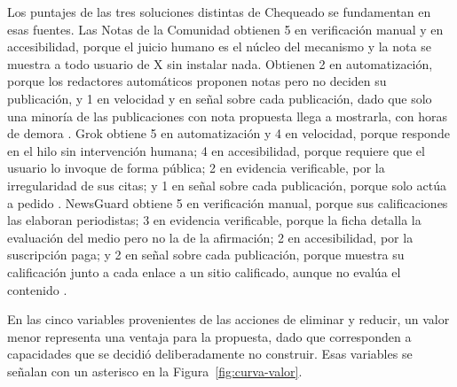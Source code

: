 Los puntajes de las tres soluciones distintas de Chequeado se fundamentan en esas fuentes. Las Notas de la Comunidad obtienen 5 en verificación manual y en accesibilidad, porque el juicio humano es el núcleo del mecanismo y la nota se muestra a todo usuario de X sin instalar nada. Obtienen 2 en automatización, porque los redactores automáticos proponen notas pero no deciden su publicación, y 1 en velocidad y en señal sobre cada publicación, dado que solo una minoría de las publicaciones con nota propuesta llega a mostrarla, con horas de demora \parencite{XCommunityNotes2026,SlaughterEtAl2025}. Grok obtiene 5 en automatización y 4 en velocidad, porque responde en el hilo sin intervención humana; 4 en accesibilidad, porque requiere que el usuario lo invoque de forma pública; 2 en evidencia verificable, por la irregularidad de sus citas; y 1 en señal sobre cada publicación, porque solo actúa a pedido \parencite{RenaultEtAl2026,JazwinskaChandrasekar2025}. NewsGuard obtiene 5 en verificación manual, porque sus calificaciones las elaboran periodistas; 3 en evidencia verificable, porque la ficha detalla la evaluación del medio pero no la de la afirmación; 2 en accesibilidad, por la suscripción paga; y 2 en señal sobre cada publicación, porque muestra su calificación junto a cada enlace a un sitio calificado, aunque no evalúa el contenido \parencite{NewsGuard2026}.

En las cinco variables provenientes de las acciones de eliminar y reducir, un valor menor representa una ventaja para la propuesta, dado que corresponden a capacidades que se decidió deliberadamente no construir. Esas variables se señalan con un asterisco en la Figura~\ref{fig:curva-valor}.

